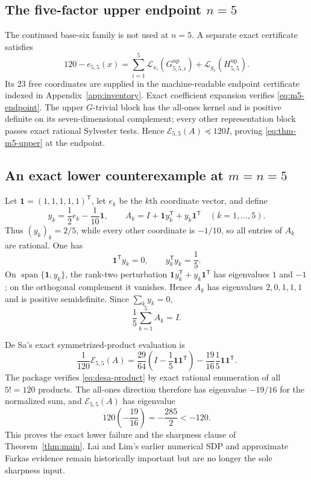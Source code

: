 \documentclass[11pt]{article}
\newcommand{\E}{\mathcal E}
\newcommand{\Lcal}{\mathcal L}
\newcommand{\up}{\mathrm{up}}
\newcommand{\one}{\mathbf 1}
\begin{document}
\subsection{The five-factor upper endpoint \texorpdfstring{\(n=5\)}{n=5}}

The continued base-six family is not used at \(n=5\).  A separate exact certificate satisfies
\begin{equation}\label{eq:m5-endpoint}
 120-e_{5,5}(x)
 =
 \sum_{i=1}^5\Lcal_{x_i}(G_{5,5,i}^{\up})
 +\Lcal_{g_5}(H_{5,5}^{\up}).
\end{equation}
Its 23 free coordinates are supplied in the machine-readable endpoint
certificate indexed in Appendix~\ref{app:inventory}.  Exact coefficient
expansion verifies \eqref{eq:m5-endpoint}.  The upper \(G\)-trivial block has
the all-ones kernel and is positive definite on its seven-dimensional
complement; every other representation block passes exact rational Sylvester
tests.  Hence
\(\E_{5,5}(A)\preceq120I\), proving \eqref{eq:thm-m5-upper} at the endpoint.

\subsection{An exact lower counterexample at \texorpdfstring{\(m=n=5\)}{m=n=5}}\label{sec:desa}

Let \(\one=(1,1,1,1,1)^{\mathsf T}\), let \(e_k\) be the \(k\)th coordinate vector, and define
\[
 y_k=\frac12e_k-\frac1{10}\one,\qquad
 A_k=I+\one y_k^{\mathsf T}+y_k\one^{\mathsf T}
 \quad(k=1,\ldots,5).
\]
Thus \((y_k)_k=2/5\), while every other coordinate is \(-1/10\), so all entries of \(A_k\) are rational.  One has
\[
 \one^{\mathsf T}y_k=0,\qquad
 y_k^{\mathsf T}y_k=\frac15.
\]
On \(\operatorname{span}\{\one,y_k\}\), the rank-two perturbation
\(\one y_k^{\mathsf T}+y_k\one^{\mathsf T}\) has eigenvalues \(1\) and \(-1\); on the orthogonal complement it vanishes.  Hence \(A_k\) has eigenvalues \(2,0,1,1,1\) and is positive semidefinite.  Since \(\sum_ky_k=0\),
\[
 \frac15\sum_{k=1}^5A_k=I.
\]

De Sa's exact symmetrized-product evaluation is
\begin{equation}\label{eq:desa-product}
 \frac1{120}\E_{5,5}(A)
 =
 \frac{29}{64}\left(I-\frac15\one\one^{\mathsf T}\right)
 -\frac{19}{16}\frac15\one\one^{\mathsf T}.
\end{equation}
The package verifies \eqref{eq:desa-product} by exact rational enumeration of all \(5!=120\) products.  The all-ones direction therefore has eigenvalue \(-19/16\) for the normalized sum, and \(\E_{5,5}(A)\) has eigenvalue
\[
 120\left(-\frac{19}{16}\right)=-\frac{285}{2}<-120.
\]
This proves the exact lower failure and the sharpness clause of Theorem~\ref{thm:main}.  Lai and Lim's earlier numerical SDP and approximate Farkas evidence remain historically important but are no longer the sole sharpness input.
\end{document}
